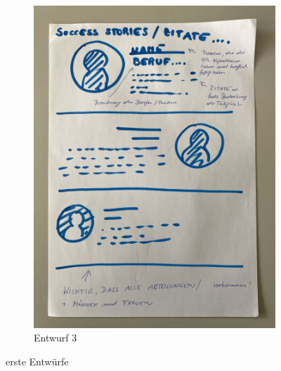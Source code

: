 \begin{figure}
\begin{subfigure}{0.3\textwidth}
     \includegraphics[width=\textwidth, angle=270]{pics/Entwurf_Beispiel_3.JPG}
     \caption{Entwurf 3}
     \label{fig:c}
   \end{subfigure}
   \caption{erste Entwürfe}
   \label{fig:impl:erste_entwuerfe}
 \end{figure}

